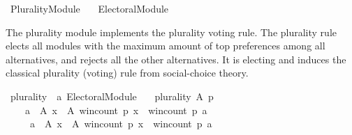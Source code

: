 %
\begin{isabellebody}%
%
%
\isadelimdocument
\isanewline
%
\endisadelimdocument
%
\isatagdocument
\isanewline
\isanewline
%
\isamarkuptrue%
%
\endisatagdocument
{\isafolddocument}%
%
\isadelimdocument
%
\endisadelimdocument
%
\isadelimtheory
%
\endisadelimtheory
%
\isatagtheory
{}\isamarkupfalse%
\ Plurality{\isacharunderscore}{\kern0pt}Module\isanewline
\ \ \ {\isachardoublequoteopen}{\isachardot}{\kern0pt}{\isachardot}{\kern0pt}{\isacharslash}{\kern0pt}Electoral{\isacharunderscore}{\kern0pt}Module{\isachardoublequoteclose}\isanewline
{}%
\endisatagtheory
{\isafoldtheory}%
%
\isadelimtheory
%
\endisadelimtheory
%
\begin{isamarkuptext}%
The plurality module implements the plurality voting rule.
The plurality rule elects all modules with the maximum amount of top
preferences among all alternatives, and rejects all the other alternatives.
It is electing and induces the classical plurality (voting) rule
from social-choice theory.%
\end{isamarkuptext}\isamarkuptrue%
%
\isadelimdocument
%
\endisadelimdocument
%
\isatagdocument
%
\isamarkuptrue%
%
\endisatagdocument
{\isafolddocument}%
%
\isadelimdocument
%
\endisadelimdocument
{}\isamarkupfalse%
\ plurality\ {\isacharcolon}{\kern0pt}{\isacharcolon}{\kern0pt}\ {\isachardoublequoteopen}{\isacharprime}{\kern0pt}a\ Electoral{\isacharunderscore}{\kern0pt}Module{\isachardoublequoteclose}\ \isanewline
\ \ {\isachardoublequoteopen}plurality\ A\ p\ {\isacharequal}{\kern0pt}\isanewline
\ \ \ \ {\isacharparenleft}{\kern0pt}{\isacharbraceleft}{\kern0pt}a\ {\isasymin}\ A{\isachardot}{\kern0pt}\ {\isasymforall}x\ {\isasymin}\ A{\isachardot}{\kern0pt}\ win{\isacharunderscore}{\kern0pt}count\ p\ x\ {\isasymle}\ win{\isacharunderscore}{\kern0pt}count\ p\ a{\isacharbraceright}{\kern0pt}{\isacharcomma}{\kern0pt}\isanewline
\ \ \ \ \ {\isacharbraceleft}{\kern0pt}a\ {\isasymin}\ A{\isachardot}{\kern0pt}\ {\isasymexists}x\ {\isasymin}\ A{\isachardot}{\kern0pt}\ win{\isacharunderscore}{\kern0pt}count\ p\ x\ {\isachargreater}{\kern0pt}\ win{\isacharunderscore}{\kern0pt}count\ p\ a{\isacharbraceright}{\kern0pt}{\isacharcomma}{\kern0pt}\isanewline
\ \ \ \ \ {\isacharbraceleft}{\kern0pt}{\isacharbraceright}{\kern0pt}{\isacharparenright}{\kern0pt}{\isachardoublequoteclose}%
\isadelimdocument
%
\endisadelimdocument

\end{isabellebody}
